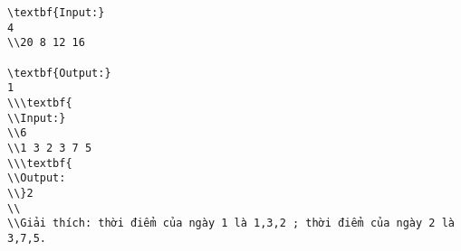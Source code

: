 \begin{verbatim}
\textbf{Input:}
4
\\20 8 12 16

\textbf{Output:}
1
\\\textbf{
\\Input:}
\\6
\\1 3 2 3 7 5
\\\textbf{
\\Output:
\\}2
\\
\\Giải thích: thời điểm của ngày 1 là 1,3,2 ; thời điểm của ngày 2 là 3,7,5.\end{verbatim}